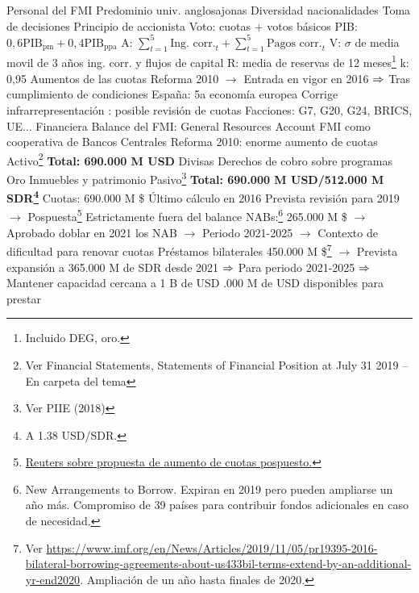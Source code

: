 \documentclass{nuevotema}
\begin{document}
\begin{esquemal}
			\3 Personal del FMI
				\4 Predominio univ. anglosajonas
				\4 Diversidad nacionalidades
			\3 Toma de decisiones
				\4 Principio de accionista
				\4 Voto: cuotas + votos básicos
				\4 
				\4[] PIB: $0,6 \textrm{PIB}_{\textrm{pm}} + 0,4 \textrm{PIB}_{\textrm{ppa}} $
				\4[] A: $\sum_{t=1}^5 \textrm{Ing. corr.}_t + \sum_{t=1}^5 \textrm{Pagos corr.}_t$
				\4[] V: $\sigma$ de media movil de 3 años ing. corr. y flujos de capital
				\4[] R: media de reservas de 12 meses\footnote{Incluido DEG, oro.}
				\4[] k: 0,95
				\4 Aumentos de las cuotas
				\4[] Reforma 2010
				\4[] $\to$ Entrada en vigor en 2016
				\4[] $\Rightarrow$ Tras cumplimiento de condiciones
				\4[] España: 5a economía europea
				\4[] Corrige infrarrepresentación
				: posible revisión de cuotas
				\4 Facciones: G7, G20, G24, BRICS, UE...
		\2 Financiera
			\3 Balance del FMI: General Resources Account
				\4 FMI como cooperativa de Bancos Centrales
				\4 Reforma 2010: enorme aumento de cuotas
			\3 Activo\footnote{Ver Financial Statements, Statements of Financial Position at July 31 2019 -- En carpeta del tema}
				\4 \textbf{Total: 690.000 M USD}
				\4 Divisas
				\4 Derechos de cobro sobre programas
				\4 Oro
				\4 Inmuebles y patrimonio
			\3 Pasivo\footnote{Ver PIIE (2018)}
				\4 \textbf{Total: 690.000 M USD/512.000 M SDR\footnote{A 1.38 USD/SDR.}}
				\4 Cuotas: 690.000 M \$
				\4[] Último cálculo en 2016
				\4[] Prevista revisión para 2019
				\4[] $\to$ Pospuesta\footnote{\href{https://www.reuters.com/article/us-imf-quotas-japan/imf-to-postpone-planned-quota-increase-due-to-u-s-resistance-source-idUSKBN1WN1GC}{Reuters sobre propuesta de aumento de cuotas pospuesto.}}
				\4 Estrictamente fuera del balance
				\4[] NABs:\footnote{New Arrangements to Borrow. Expiran en 2019 pero pueden ampliarse un año más. Compromiso de 39 países para contribuir fondos adicionales en caso de necesidad. } 265.000 M \$
				\4[] $\to$ Aprobado doblar en 2021 los NAB
				\4[] $\to$ Periodo 2021-2025
				\4[] $\to$ Contexto de dificultad para renovar cuotas
				\4[] Préstamos bilaterales 450.000 M \$\footnote{Ver \url{https://www.imf.org/en/News/Articles/2019/11/05/pr19395-2016-bilateral-borrowing-agreements-about-us433bil-terms-extend-by-an-additional-yr-end2020}. Ampliación de un año hasta finales de 2020.}
				\4[] $\to$ Prevista expansión a 365.000 M de SDR desde 2021
				\4[] $\Rightarrow$ Para periodo 2021-2025
				\4[] $\Rightarrow$ Mantener capacidad cercana a 1 B de USD
				.000 M de USD disponibles para prestar

\end{esquemal}
\end{document}
